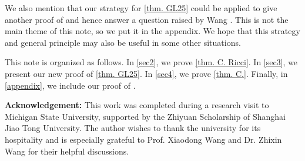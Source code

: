 \documentclass[12pt]{amsart}
\numberwithin{equation}{section}
\numberwithin{lemma}{section}
\numberwithin{proposition}{section}
\numberwithin{corollary}{section}
\numberwithin{remark}{section}
\begin{document}
    We also mention that our strategy for \cref{thm. GL25} could be applied to give another proof of \cite[Theorem 6.1]{BVV91} and hence answer a question raised by Wang \cite[Section 5]{Wan22}. This is not the main theme of this note, so we put it in the appendix. We hope that this strategy and general principle may also be useful in some other situations.

    This note is organized as follows. In \cref{sec2}, we prove \cref{thm. C. Ricci}. In \cref{sec3}, we present our new proof of \cref{thm. GL25}. In \cref{sec4}, we prove \cref{thm. C.}. Finally, in \cref{appendix}, we include our proof of \cite[Theorem 6.1]{BVV91}.
 
\textbf{Acknowledgement:} This work was completed during a research visit to Michigan State University, supported by the Zhiyuan Scholarship of Shanghai Jiao Tong University. The author wishes to thank the university for its hospitality and is especially grateful to Prof. Xiaodong Wang and Dr. Zhixin Wang for their helpful discussions.
\end{document}
